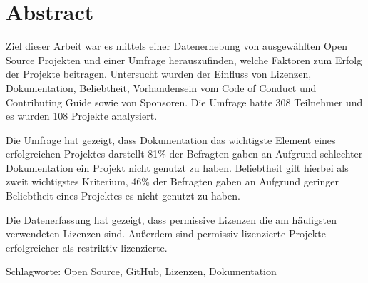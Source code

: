 \chapter*{Abstract}
\thispagestyle{empty}

Ziel dieser Arbeit war es mittels einer Datenerhebung von ausgewählten Open Source Projekten und einer
Umfrage herauszufinden, welche Faktoren zum Erfolg der Projekte beitragen.
Untersucht wurden der Einfluss von Lizenzen, Dokumentation, Beliebtheit, Vorhandensein vom Code of
Conduct und Contributing Guide sowie von Sponsoren.
Die Umfrage hatte 308 Teilnehmer und es wurden 108 Projekte analysiert.

Die Umfrage hat gezeigt, dass Dokumentation das wichtigste Element eines erfolgreichen Projektes darstellt
81\% der Befragten gaben an Aufgrund schlechter Dokumentation ein Projekt nicht genutzt zu haben.
Beliebtheit gilt hierbei als zweit wichtigstes Kriterium, 46\% der Befragten gaben an Aufgrund geringer
Beliebtheit eines Projektes es nicht genutzt zu haben.

Die Datenerfassung hat gezeigt, dass permissive Lizenzen die am häufigsten verwendeten Lizenzen sind.
Außerdem sind permissiv lizenzierte Projekte erfolgreicher als restriktiv lizenzierte.


\bigskip

\noindent
Schlagworte: Open Source, GitHub, Lizenzen, Dokumentation

